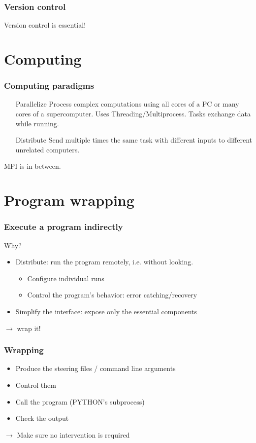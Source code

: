 \documentclass[14pt]{beamer}
\begin{document}
\begin{frame}
\frametitle{Version control}
\centering
\alert{Version control is essential!}
\end{frame}

\section{Computing}
\begin{frame}
\frametitle{Computing paradigms}
\begin{itemize}
\item[Parallelize] Process complex computations using all cores of a PC or many cores of a supercomputer. Uses Threading/Multiprocess. Tasks exchange data while running.
\item[Distribute] Send multiple times the same task with different inputs to different unrelated computers.
\end{itemize}
MPI is in between.
\end{frame}

\section{Program wrapping}
\begin{frame}
\frametitle{Execute a program indirectly}
Why?
\begin{itemize}
\item Distribute: run the program remotely, i.e. without looking. 
\begin{itemize}
\item Configure individual runs
\item Control the program's behavior: error catching/recovery
\end{itemize}
\item Simplify the interface: expose only the essential components
\end{itemize}
$\rightarrow$ wrap it!
\end{frame}

\begin{frame}
\frametitle{Wrapping}
\begin{itemize}
\item Produce the steering files / command line arguments
\item Control them
\item Call the program (PYTHON's subprocess)
\item Check the output
\end{itemize}
$\rightarrow$ Make sure no intervention is required
\end{frame}
\end{document}

